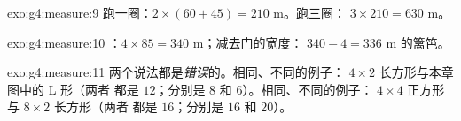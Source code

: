 \begin{solution}{exo:g4:measure:9}
跑一圈：$2 \times (60 + 45) = 210$ m。跑三圈：
$3 \times 210 = 630$ m。
\end{solution}

\begin{solution}{exo:g4:measure:10}
：$4 \times 85 = 340$ m；减去门的宽度：
$340 - 4 = 336$ m 的篱笆。
\end{solution}

\begin{solution}{exo:g4:measure:11}
两个说法都是\emph{错误}的。相同、不同的例子：
$4 \times 2$ 长方形与本章图中的 L 形（两者
都是 $12$；分别是 $8$ 和 $6$）。相同、不同的例子：
$4 \times 4$ 正方形与 $8 \times 2$ 长方形（两者
都是 $16$；分别是 $16$ 和 $20$）。
\end{solution}

